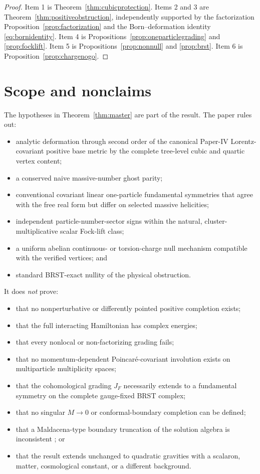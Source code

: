 \documentclass[11pt]{article}
\theoremstyle{definition}
\theoremstyle{remark}
\begin{document}
\begin{proof}
Item 1 is Theorem~\ref{thm:cubicprotection}.  Items 2 and 3 are
Theorem~\ref{thm:positiveobstruction}, independently supported by the
factorization Proposition~\ref{prop:factorization} and the
Born--deformation identity \eqref{eq:bornidentity}.  Item 4 is
Propositions~\ref{prop:oneparticlegrading} and \ref{prop:focklift}.
Item 5 is
Propositions~\ref{prop:nonnull} and \ref{prop:brst}.  Item 6 is
Proposition~\ref{prop:chargenogo}.
\end{proof}

\section{Scope and nonclaims}\label{sec:scope}

The hypotheses in Theorem~\ref{thm:master} are part of the result.  The
paper rules out:
\begin{itemize}
\item analytic deformation through second order of the canonical
Paper-IV Lorentz-covariant positive base metric by the complete
tree-level cubic and quartic vertex content;
\item a conserved naive massive-number ghost parity;
\item conventional covariant linear one-particle fundamental symmetries
that agree with the free real form but differ on selected massive
helicities;
\item independent particle-number-sector signs within the natural,
cluster-multiplicative scalar Fock-lift class;
\item a uniform abelian continuous- or torsion-charge null mechanism
compatible with the verified vertices; and
\item standard BRST-exact nullity of the physical obstruction.
\end{itemize}

It does \emph{not} prove:
\begin{itemize}
\item that no nonperturbative or differently pointed positive completion
exists;
\item that the full interacting Hamiltonian has complex energies;
\item that every nonlocal or non-factorizing grading fails;
\item that no momentum-dependent Poincar\'e-covariant involution exists
on multiparticle multiplicity spaces;
\item that the cohomological grading $J_F$ necessarily extends to a
fundamental symmetry on the complete gauge-fixed BRST complex;
\item that no singular $M\to0$ or conformal-boundary completion can be
defined;
\item that a Maldacena-type boundary truncation of the solution algebra is
inconsistent \cite{Maldacena}; or
\item that the result extends unchanged to quadratic gravities with a
scalaron, matter, cosmological constant, or a different background.
\end{itemize}
\end{document}
